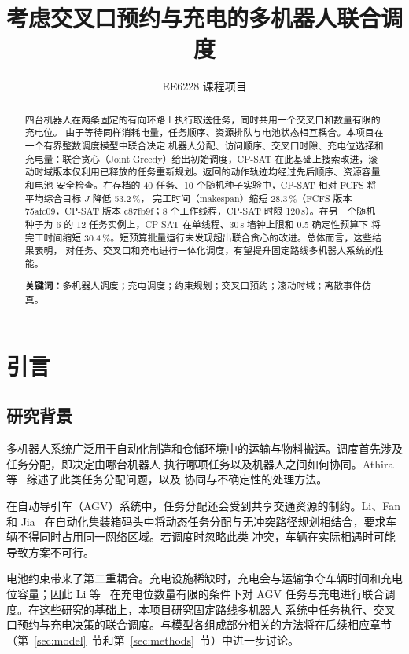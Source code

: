\documentclass[11pt,a4paper,fontset=none]{ctexart}
\title{\textbf{考虑交叉口预约与充电的多机器人联合调度}}
\author{EE6228 课程项目}
\date{}
\newcommand{\pct}{\,\%}
\begin{document}
\maketitle

\begin{abstract}
\noindent 四台机器人在两条固定的有向环路上执行取送任务，同时共用一个交叉口和数量有限的充电位。
由于等待同样消耗电量，任务顺序、资源排队与电池状态相互耦合。本项目在一个有界整数调度模型中联合决定
机器人分配、访问顺序、交叉口时隙、充电位选择和充电量：联合贪心（Joint Greedy）给出初始调度，CP-SAT
在此基础上搜索改进，滚动时域版本仅利用已释放的任务重新规划。返回的动作轨迹均经过先后顺序、资源容量和电池
安全检查。在存档的 40 任务、10 个随机种子实验中，CP-SAT 相对 FCFS 将平均综合目标 $J$ 降低 53.2\pct，
完工时间（makespan）缩短 28.3\pct（FCFS 版本 75afc09，CP-SAT 版本 c87fb9f；8 个工作线程，CP-SAT 时限
120\,s）。在另一个随机种子为 6 的 12 任务实例上，CP-SAT 在单线程、30\,s 墙钟上限和 0.5 确定性预算下
将完工时间缩短 30.4\pct。短预算批量运行未发现超出联合贪心的改进。总体而言，这些结果表明，
对任务、交叉口和充电进行一体化调度，有望提升固定路线多机器人系统的性能。

\medskip\noindent\textbf{关键词：}多机器人调度；充电调度；约束规划；交叉口预约；滚动时域；离散事件仿真。
\end{abstract}

\section{引言}

\subsection{研究背景}

多机器人系统广泛用于自动化制造和仓储环境中的运输与物料搬运。调度首先涉及任务分配，即决定由哪台机器人
执行哪项任务以及机器人之间如何协同。Athira 等~\cite{athira2025mrta} 综述了此类任务分配问题，以及
协同与不确定性的处理方法。

在自动导引车（AGV）系统中，任务分配还会受到共享交通资源的制约。Li、Fan 和 Jia~\cite{li2024conflict}
在自动化集装箱码头中将动态任务分配与无冲突路径规划相结合，要求车辆不得同时占用同一网络区域。若调度时忽略此类
冲突，车辆在实际相遇时可能导致方案不可行。

电池约束带来了第二重耦合。充电设施稀缺时，充电会与运输争夺车辆时间和充电位容量；因此 Li 等~\cite{li2025chargers}
在充电位数量有限的条件下对 AGV 任务与充电进行联合调度。在这些研究的基础上，本项目研究固定路线多机器人
系统中任务执行、交叉口预约与充电决策的联合调度。与模型各组成部分相关的方法将在后续相应章节
（第~\ref{sec:model}~节和第~\ref{sec:methods}~节）中进一步讨论。
\end{document}
